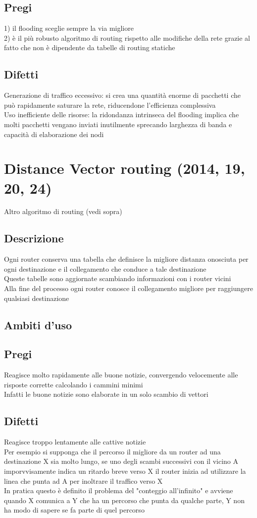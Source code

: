 \documentclass[10pt,oneside,a4paper]{article}
\begin{document}
\subsection{Pregi}
1) il flooding sceglie sempre la via migliore\\
2) è il più robusto algoritmo di routing rispetto alle modifiche della rete grazie al fatto che non è dipendente da tabelle di routing statiche
\subsection{Difetti}
Generazione di traffico eccessivo: si crea una quantità enorme di pacchetti che può rapidamente saturare la rete, riducendone l'efficienza complessiva \\
Uso inefficiente delle risorse: la ridondanza intrinseca del flooding implica che molti pacchetti vengano inviati inutilmente sprecando larghezza di banda e capacità di elaborazione dei nodi
\section{Distance Vector routing (2014, 19, 20, 24)}
Altro algoritmo di routing (vedi sopra)\\
\subsection{Descrizione}
Ogni router conserva una tabella che definisce la migliore distanza onosciuta per ogni destinazione e il collegamento che conduce a tale destinazione\\
Queste tabelle sono aggiornate scambiando informazioni con i router vicini\\
Alla fine del processo ogni router conosce il collegamento migliore per raggiungere qualsiasi destinazione
\subsection{Ambiti d'uso}
\subsection{Pregi}
Reagisce molto rapidamente alle buone notizie, convergendo velocemente alle risposte corrette calcolando i cammini minimi\\
Infatti le buone notizie sono elaborate in un solo scambio di vettori 
\subsection{Difetti}
Reagisce troppo lentamente alle cattive notizie\\
Per esempio si supponga che il percorso il migliore da un router ad una destinazione X sia molto lungo, se uno degli scambi successivi con il vicino A imporvvisamente indica un ritardo breve verso X il router inizia ad utilizzare la linea che punta ad A per inoltrare il traffico verso X\\
In pratica questo è definito il problema del "conteggio all'infinito" e avviene quando X comunica a Y che ha un percorso che punta da qualche parte, Y non ha modo di sapere se fa parte di quel percorso
\end{document}
